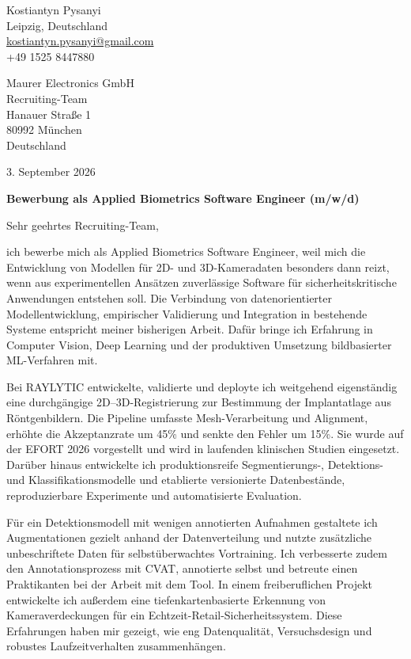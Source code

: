 \documentclass[11pt,a4paper]{article}
\begin{document}
\begin{flushright}
Kostiantyn Pysanyi\\
Leipzig, Deutschland\\
\href{mailto:kostiantyn.pysanyi@gmail.com}{kostiantyn.pysanyi@gmail.com}\\
+49 1525 8447880
\end{flushright}

Maurer Electronics GmbH\\
Recruiting-Team\\
Hanauer Straße 1\\
80992 München\\
Deutschland

\begin{flushright}
3. September 2026
\end{flushright}

\textbf{Bewerbung als Applied Biometrics Software Engineer (m/w/d)}

Sehr geehrtes Recruiting-Team,

ich bewerbe mich als Applied Biometrics Software Engineer, weil mich die Entwicklung von Modellen für 2D- und 3D-Kameradaten besonders dann reizt, wenn aus experimentellen Ansätzen zuverlässige Software für sicherheitskritische Anwendungen entstehen soll. Die Verbindung von datenorientierter Modellentwicklung, empirischer Validierung und Integration in bestehende Systeme entspricht meiner bisherigen Arbeit. Dafür bringe ich Erfahrung in Computer Vision, Deep Learning und der produktiven Umsetzung bildbasierter ML-Verfahren mit.

Bei RAYLYTIC entwickelte, validierte und deployte ich weitgehend eigenständig eine durchgängige 2D--3D-Registrierung zur Bestimmung der Implantatlage aus Röntgenbildern. Die Pipeline umfasste Mesh-Verarbeitung und Alignment, erhöhte die Akzeptanzrate um 45\% und senkte den Fehler um 15\%. Sie wurde auf der EFORT 2026 vorgestellt und wird in laufenden klinischen Studien eingesetzt. Darüber hinaus entwickelte ich produktionsreife Segmentierungs-, Detektions- und Klassifikationsmodelle und etablierte versionierte Datenbestände, reproduzierbare Experimente und automatisierte Evaluation.

Für ein Detektionsmodell mit wenigen annotierten Aufnahmen gestaltete ich Augmentationen gezielt anhand der Datenverteilung und nutzte zusätzliche unbeschriftete Daten für selbstüberwachtes Vortraining. Ich verbesserte zudem den Annotationsprozess mit CVAT, annotierte selbst und betreute einen Praktikanten bei der Arbeit mit dem Tool. In einem freiberuflichen Projekt entwickelte ich außerdem eine tiefenkartenbasierte Erkennung von Kameraverdeckungen für ein Echtzeit-Retail-Sicherheitssystem. Diese Erfahrungen haben mir gezeigt, wie eng Datenqualität, Versuchsdesign und robustes Laufzeitverhalten zusammenhängen.
\end{document}
